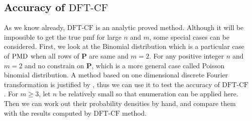 \documentclass[12pt]{article}
\newcommand{\Pmat}{\mathbf{P}}
\newcommand{\PMD}{{\normalfont\textrm{PMD}}}
\newcommand{\dft}{{\textrm{DFT-CF}}}
\begin{document}
\subsection{Accuracy of $\dft$}
As we know already, $\dft$ is an analytic proved method. Although it will be impossible to get the true pmf for large $n$ and $m$, some special cases can be considered. First, we look at the Binomial distribution which is a particular case of $\PMD$ when all rows of $\Pmat$ are same and $m=2$. For any positive integer $n$ and $m=2$ and no constrain on $\Pmat$, which is a more general case called Poisson binomial distribution. A method based on one dimensional discrete Fourier transformation is justified by , thus we can use it to test the accuracy of $\dft$. For $m \geq 3$, let $n$ be relatively small so that enumeration can be applied here. Then we can work out their probability densities by hand, and compare them with the results computed by $\dft$ method.
\end{document}

